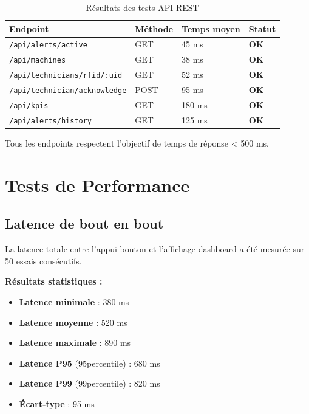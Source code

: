\begin{table}[htbp]
\centering
\caption{Résultats des tests API REST}
\label{tab:resultats_api}
\small
\begin{tabular}{@{}p{5cm}p{2cm}p{2.5cm}p{2cm}@{}}
\toprule
\textbf{Endpoint} & \textbf{Méthode} & \textbf{Temps moyen} & \textbf{Statut} \\
\midrule
\rowcolor{gray!10}
\texttt{/api/alerts/active} & GET & 45 ms & \textcolor{green!60!black}{\textbf{OK}} \\
\texttt{/api/machines} & GET & 38 ms & \textcolor{green!60!black}{\textbf{OK}} \\
\rowcolor{gray!10}
\texttt{/api/technicians/rfid/:uid} & GET & 52 ms & \textcolor{green!60!black}{\textbf{OK}} \\
\texttt{/api/technician/acknowledge} & POST & 95 ms & \textcolor{green!60!black}{\textbf{OK}} \\
\rowcolor{gray!10}
\texttt{/api/kpis} & GET & 180 ms & \textcolor{green!60!black}{\textbf{OK}} \\
\texttt{/api/alerts/history} & GET & 125 ms & \textcolor{green!60!black}{\textbf{OK}} \\
\bottomrule
\end{tabular}
\end{table}

Tous les endpoints respectent l'objectif de temps de réponse < 500 ms.

\section{Tests de Performance}

\subsection{Latence de bout en bout}

La latence totale entre l'appui bouton et l'affichage dashboard a été mesurée sur 50 essais consécutifs.

\textbf{Résultats statistiques :}
\begin{itemize}
    \item \textbf{Latence minimale} : 380 ms
    \item \textbf{Latence moyenne} : 520 ms
    \item \textbf{Latence maximale} : 890 ms
    \item \textbf{Latence P95} (95\ieme percentile) : 680 ms
    \item \textbf{Latence P99} (99\ieme percentile) : 820 ms
    \item \textbf{Écart-type} : 95 ms
\end{itemize}

